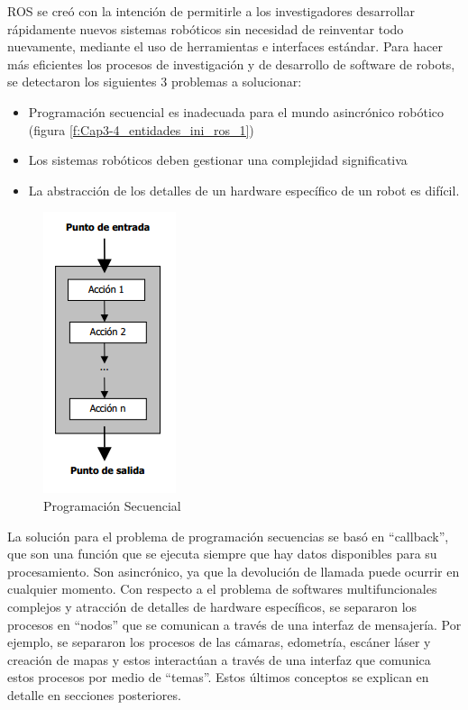     ROS se creó con la intención de permitirle a los investigadores desarrollar rápidamente nuevos sistemas robóticos sin necesidad de reinventar todo nuevamente, mediante el uso de herramientas e interfaces estándar. Para hacer más eficientes los procesos de investigación y de desarrollo de software de robots, se detectaron los siguientes 3 problemas a solucionar:
    
    \begin{itemize}
        \item {Programación secuencial es inadecuada para el mundo asincrónico robótico (figura \eqref{f:Cap3-4_entidades_ini_ros_1})}
        \item {Los sistemas robóticos deben gestionar una complejidad significativa}
        \item {La abstracción de los detalles de un hardware específico de un robot es difícil.}
    \end{itemize}

        \begin{figure}[htbp]
            \centering
            \includegraphics[width=0.25\linewidth]{Main/Chapter3/Images3/agrupar_problem_111.png}
            \caption{Programación Secuencial}
            \label{f:Cap3-4_entidades_ini_ros_1}
        \end{figure}
        
    La solución para el problema de programación secuencias se basó en “callback”, que son una función que se ejecuta siempre que hay datos disponibles para su procesamiento. Son asincrónico, ya que la devolución de llamada puede ocurrir en cualquier momento. Con respecto a el problema de softwares multifuncionales complejos y atracción de detalles de hardware específicos, se separaron los procesos en “nodos” que se comunican a través de una interfaz de mensajería. Por ejemplo, se separaron los procesos de las cámaras, edometría, escáner láser y creación de mapas y estos interactúan a través de una interfaz que comunica estos procesos por medio de “temas”. Estos últimos conceptos se explican en detalle en secciones posteriores.

